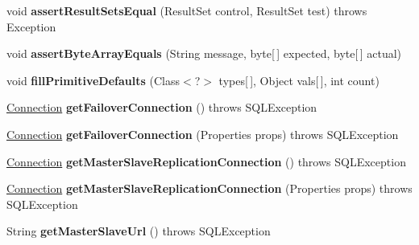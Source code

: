 \begin{DoxyCompactItemize}
void {\bfseries assert\+Result\+Sets\+Equal} (Result\+Set control, Result\+Set test)  throws Exception 
\item 
\mbox{\label{classtestsuite_1_1_base_test_case_a64c93499839212c311d50823ef3f4edc}} 
void {\bfseries assert\+Byte\+Array\+Equals} (String message, byte\mbox{[}$\,$\mbox{]} expected, byte\mbox{[}$\,$\mbox{]} actual)
\item 
\mbox{\label{classtestsuite_1_1_base_test_case_a0a24b304ec6c8bcc8ffa37528d1c0800}} 
void {\bfseries fill\+Primitive\+Defaults} (Class$<$?$>$ types\mbox{[}$\,$\mbox{]}, Object vals\mbox{[}$\,$\mbox{]}, int count)
\item 
\mbox{\label{classtestsuite_1_1_base_test_case_aa0bd46e11f461b964afb1a93a6e5aa15}} 
\mbox{\hyperlink{interfacecom_1_1mysql_1_1jdbc_1_1_connection}{Connection}} {\bfseries get\+Failover\+Connection} ()  throws S\+Q\+L\+Exception 
\item 
\mbox{\label{classtestsuite_1_1_base_test_case_a7b89fc31036d3e6e4903f21c98477de4}} 
\mbox{\hyperlink{interfacecom_1_1mysql_1_1jdbc_1_1_connection}{Connection}} {\bfseries get\+Failover\+Connection} (Properties props)  throws S\+Q\+L\+Exception 
\item 
\mbox{\label{classtestsuite_1_1_base_test_case_a3ca1d1435694c5409c44d10e68800ccd}} 
\mbox{\hyperlink{interfacecom_1_1mysql_1_1jdbc_1_1_connection}{Connection}} {\bfseries get\+Master\+Slave\+Replication\+Connection} ()  throws S\+Q\+L\+Exception 
\item 
\mbox{\label{classtestsuite_1_1_base_test_case_aafbc4ce5f24d35545475dfe8ccd213f1}} 
\mbox{\hyperlink{interfacecom_1_1mysql_1_1jdbc_1_1_connection}{Connection}} {\bfseries get\+Master\+Slave\+Replication\+Connection} (Properties props)  throws S\+Q\+L\+Exception 
\item 
\mbox{\label{classtestsuite_1_1_base_test_case_ae368e9f56d2795da57e928cba4528ebb}} 
String {\bfseries get\+Master\+Slave\+Url} ()  throws S\+Q\+L\+Exception 
\item 

\end{DoxyCompactItemize}
